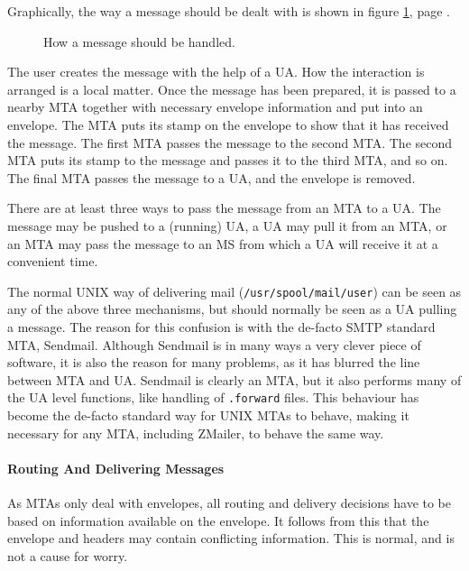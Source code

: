 Graphically, the way a message should be dealt with is shown 
in figure \ref{msg_rout}, page \pageref{msg_rout}.

\begin{figure}[tbp]
\centerline{}
\caption{\label{msg_rout}How a message should be handled. }
\end{figure}








The user creates the message with the help of a UA. How the interaction 
is arranged is a local matter. Once the message has been prepared, 
it is passed to a nearby MTA together with necessary envelope 
information and put into an envelope. The MTA puts its stamp on 
the envelope to show that it has received the message. The first 
MTA passes the message to the second MTA. The second MTA puts its 
stamp to the message and passes it to the third MTA, and so on. 
The final MTA passes the message to a UA, and the envelope is removed.

There are at least three ways to pass the message from an MTA to a UA. 
The message may be pushed to a (running) UA, a UA may pull it from an MTA, 
or an MTA may pass the message to an MS from which a UA will receive it at 
a convenient time.

The normal UNIX way of delivering mail ({\tt /usr/spool/mail/user}) can be 
seen as any of the above three mechanisms, but should normally be seen as a 
UA pulling a message. The reason for this confusion is with the de-facto SMTP 
standard MTA, Sendmail. Although Sendmail is in many ways a very clever 
piece of software, it is also the reason for many problems, as it has 
blurred the line between MTA and UA. Sendmail is clearly an MTA, but 
it also performs many of the UA level functions, like handling of 
{\tt .forward} files. This behaviour has become the de-facto standard 
way for UNIX MTAs to behave, making it necessary for any MTA, including ZMailer, 
to behave the same way.




\paragraph{Routing And Delivering Messages}



As MTAs only deal with envelopes, all routing and delivery decisions have to be 
based on information available on the envelope. It follows from this that 
the envelope and headers may contain conflicting information. This is normal, 
and is not a cause for worry.

